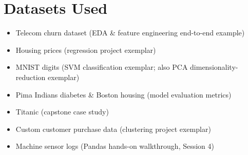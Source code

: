 \section{Datasets Used}
\label{sec:datasets}

\begin{itemize}
\item Telecom churn dataset (EDA \& feature engineering end-to-end example)
\item Housing prices (regression project exemplar)
\item MNIST digits (SVM classification exemplar; also PCA dimensionality-reduction exemplar)
\item Pima Indians diabetes \& Boston housing (model evaluation metrics)
\item Titanic (capstone case study)
\item Custom customer purchase data (clustering project exemplar)
\item Machine sensor logs (Pandas hands-on walkthrough, Session 4)
\end{itemize}
